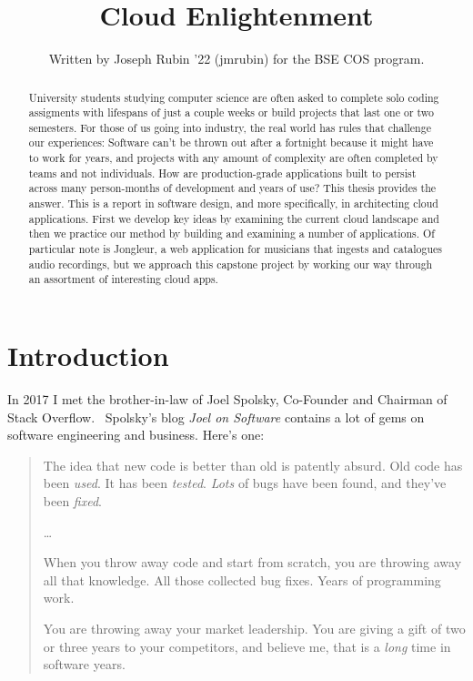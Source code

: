 \documentclass{article}
\begin{document}
\title{Cloud Enlightenment}

\author{Written by Joseph Rubin '22 (jmrubin) for the BSE COS program.}

\date{}
\maketitle

\thispagestyle{empty}


\begin{abstract}
  University students studying computer science are often asked to complete solo coding assigments with lifespans of just a couple weeks or build projects that last one or two semesters.
  For those of us going into industry, the real world has rules that challenge our experiences:
  Software can't be thrown out after a fortnight because it might have to work for years, and projects with any amount of complexity are often completed by teams and not individuals.
  How are production-grade applications built to persist across many person-months of development and years of use?
  This thesis provides the answer.
  This is a report in software design, and more specifically, in architecting cloud applications.
  First we develop key ideas by examining the current cloud landscape and then we practice our method by building and examining a number of applications.
  Of particular note is Jongleur, a web application for musicians that ingests and catalogues audio recordings, but we approach this capstone project by working our way through an assortment of interesting cloud apps.
\end{abstract}

\newpage

\section{Introduction}

In 2017 I met the brother-in-law of Joel Spolsky, Co-Founder and Chairman of Stack Overflow.~\cite{stack-overflow}
Spolsky's blog \textit{Joel on Software} contains a lot of gems on software engineering and business.
Here's one:

\begin{quote}
  The idea that new code is better than old is patently absurd.
  Old code has been \textit{used}.
  It has been \textit{tested}.
  \textit{Lots} of bugs have been found, and they’ve been \textit{fixed}.

  \ldots

  When you throw away code and start from scratch, you are throwing away all that knowledge.
  All those collected bug fixes.
  Years of programming work.

  You are throwing away your market leadership.
  You are giving a gift of two or three years to your competitors, and believe me, that is a \textit{long} time in software years.~\cite{joel-old-code}
\end{quote}
\end{document}
